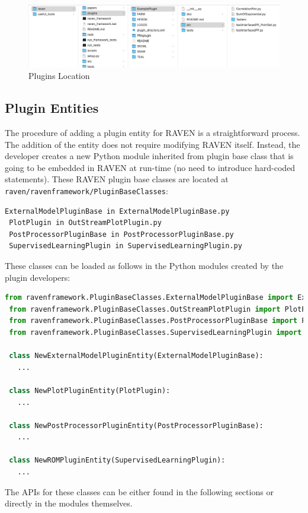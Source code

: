\begin{figure}
\centering
\includegraphics[width=1.0\textwidth]{pics/plugins_location.png}
\caption{Plugins Location}
\label{fig:pluginsLocation}
\end{figure}

\subsection{Plugin Entities}
The procedure of adding a plugin entity for RAVEN is a straightforward process.
The addition of the entity does not require modifying RAVEN itself.
Instead, the developer creates a new Python module inherited from plugin base class that is going to be embedded
in RAVEN at run-time (no need to introduce  hard-coded statements). These RAVEN plugin base
classes are located at \texttt{raven/ravenframework/PluginBaseClasses}:
\begin{lstlisting}[language=bash]
 ExternalModelPluginBase in ExternalModelPluginBase.py
 PlotPlugin in OutStreamPlotPlugin.py
 PostProcessorPluginBase in PostProcessorPluginBase.py
 SupervisedLearningPlugin in SupervisedLearningPlugin.py
\end{lstlisting}
These classes can be loaded as follows in the Python modules created by the plugin developers:
\begin{lstlisting}[language=python, basicstyle=\scriptsize\ttfamily, breaklines=True, columns=fullflexible]
 from ravenframework.PluginBaseClasses.ExternalModelPluginBase import ExternalModelPluginBase
 from ravenframework.PluginBaseClasses.OutStreamPlotPlugin import PlotPlugin
 from ravenframework.PluginBaseClasses.PostProcessorPluginBase import PostProcessorPluginBase
 from ravenframework.PluginBaseClasses.SupervisedLearningPlugin import SupervisedLearningPlugin

 class NewExternalModelPluginEntity(ExternalModelPluginBase):
   ...

 class NewPlotPluginEntity(PlotPlugin):
   ...

 class NewPostProcessorPluginEntity(PostProcessorPluginBase):
   ...

 class NewROMPluginEntity(SupervisedLearningPlugin):
   ...
\end{lstlisting}
The APIs for these classes can be either found in the following sections or directly in the modules themselves.

